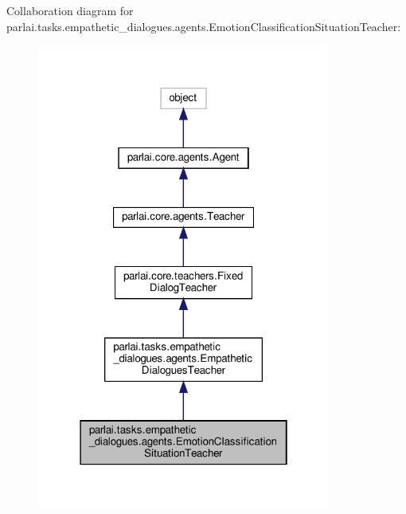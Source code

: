 Collaboration diagram for parlai.\+tasks.\+empathetic\+\_\+dialogues.\+agents.\+Emotion\+Classification\+Situation\+Teacher\+:
\nopagebreak
\begin{figure}[H]
\begin{center}
\leavevmode
\includegraphics[width=274pt]{dc/d79/classparlai_1_1tasks_1_1empathetic__dialogues_1_1agents_1_1EmotionClassificationSituationTeacher__coll__graph}
\end{center}
\end{figure}
